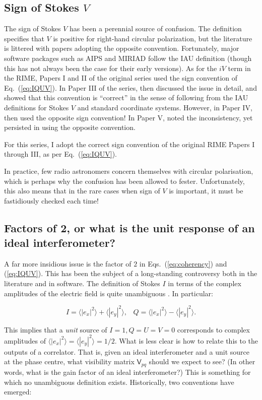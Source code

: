 \documentclass{aa}
\newcommand{\coh}[2]{\mathsf{{#1}}_{{#2}}}
\begin{document}
\subsection{Sign of Stokes $V$}

The sign of Stokes $V$ has been a perennial source of confusion. The \citet{IAU74} definition specifies that $V$ is positive for right-hand circular polarization, but the literature is littered with papers adopting the opposite convention. Fortunately, major software packages such as AIPS and MIRIAD follow the IAU definition (though this 
has not always been the case for their early versions). As for the $iV$ term in the RIME, Papers I and II of the original series \citep{ME1,ME2} used the sign convention of Eq.~(\ref{eq:IQUV}). In Paper III of the series, \citet{ME3} then discussed the issue in detail, and showed that this convention is ``correct'' in the sense of following from the IAU definitions for Stokes $V$ and standard coordinate systems. However, in Paper IV, \citet{ME4} then used the opposite sign convention! In Paper V, \citet{ME5} noted the inconsistency, yet persisted in using the opposite convention. 

For this series, I adopt the correct sign convention of the original RIME Papers I through III, as per Eq.~(\ref{eq:IQUV}).

In practice, few radio astronomers concern themselves with circular polarisation, which is perhaps why the confusion has been allowed to fester. Unfortunately, this also means that in the rare cases when sign of $V$ is important, it
must be fastidiously checked each time!

\subsection{\label{sec:factor2}Factors of 2, or what is the unit response of an ideal interferometer?}

A far more insidious issue is the factor of $2$ in Eqs.~(\ref{eq:coherency}) and (\ref{eq:IQUV}). This has been the subject of a long-standing controversy both in the literature and in software. The definition of Stokes $I$ in terms of the complex amplitudes of the electric field is quite unambiguous \citep{tms,born-wolf}. In particular:

\[
I=\langle |e_x|^2\rangle  + \langle |e_y|^2\rangle, \;\;\;
Q=\langle |e_x|^2\rangle  - \langle |e_y|^2\rangle.
\]

This implies that a {\em unit} source of $I=1, Q=U=V=0$ corresponds to complex amplitudes of $\langle |e_x|^2\rangle =\langle |e_y|^2\rangle = 1/2$. What is less clear is how to relate this to the outputs of a correlator. That is, given an ideal interferometer and a unit source at the phase centre, what visibility matrix $\coh{V}{pq}$ should we expect to see? (In other words, what is the gain factor of an ideal interferometer?) This is something for which no unambiguous definition exists. Historically, two conventions have emerged:
\end{document}
